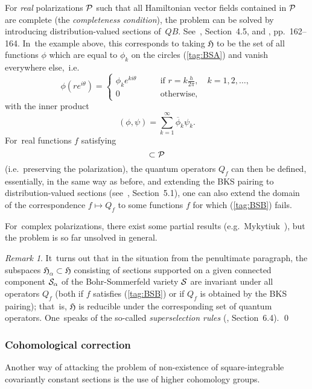 \documentclass[12pt]{amsart}
\numberwithin{equation}{section}
\theoremstyle{remark}
\newtheorem{remark*}{Remark}
\newcommand\PP{{\Cal P}}
\newcommand\HH{\mathfrak H}
\begin{document}
For {\it real} polarizations $\PP$ such that all Hamiltonian vector fields
contained in $\PP$ are complete (the {\it completeness condition\/}), the
problem can be solved by introducing distribution-valued sections of~$QB$.
See~\cite{bib:SniaB}, Section~4.5, and \cite{bib:WoodhOLD}, pp.~162--164.
In~the example above, this corresponds to taking $\HH$ to be the set of all
functions $\phi$ which are equal to $\phi_k$ on the circles (\ref{tag:BSA}) and
vanish everywhere else,~i.e.
\begin{equation}  \phi(r e^{i\theta}) = \begin{cases} \phi_k e^{ki\theta}
\qquad &\text{if }r=k\frac h{2\pi}, \quad k=1,2,\dots, \\ 0 &\text{otherwise,}
\end{cases}  \label{tag:PHI}  \end{equation}
with the inner product
$$ (\phi,\psi) = \sum_{k=1}^\infty \overline\phi_k \psi_k.  $$
For~real functions $f$ satisfying
\begin{equation}  [X_f,\PP]\subset\PP   \label{tag:BSB}  \end{equation}
(i.e.~preserving the polarization), the quantum operators $Q_f$ can then be
defined, essentially, in the same way as before, and extending the BKS pairing
to distribution-valued sections (see~\cite{bib:SniaB}, Section~5.1), one can
also extend the domain of the correspondence $f\mapsto Q_f$ to some functions
$f$ for which (\ref{tag:BSB}) fails.

For~complex polarizations, there exist some partial results
(e.g.~Mykytiuk~\cite{bib:Myky}), but the problem is so far unsolved in general.

\begin{remark*} It~turns out that in the situation from the penultimate
paragraph, the subspaces $\HH_\alpha\subset\HH$ consisting of sections
supported on a given connected component $\mathcal S_\alpha$ of the Bohr-Sommerfeld
variety $\mathcal S$ are invariant under all operators $Q_f$ (both if $f$ satisfies
(\ref{tag:BSB}) or if $Q_f$ is obtained by the BKS pairing); that~is, $\HH$ is
reducible under the corresponding set of quantum operators. One~speaks of the
so-called {\it superselection rules\/} (\cite{bib:SniaB}, Section~6.4).  \qed
\end{remark*}

\subsubsection{Cohomological correction} \label{sec262}
Another way of attacking the problem of non-existence of square-integrable
covariantly constant sections is the use of higher cohomology groups.
\end{document}
